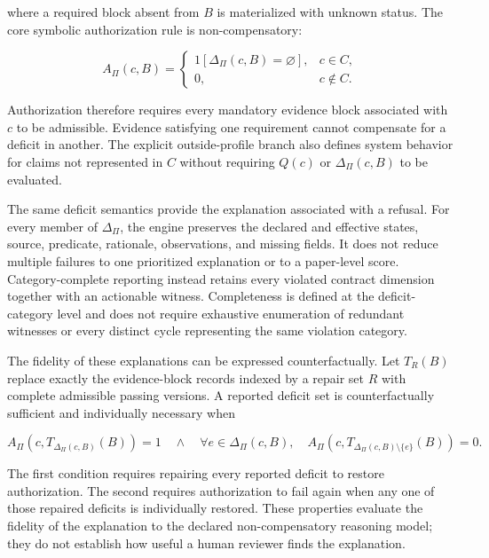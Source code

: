 \documentclass[11pt,a4paper]{article}
\begin{document}
where a required block absent from $B$ is materialized with unknown status.
The core symbolic authorization rule is non-compensatory:

\begin{equation}
A_{\Pi}(c,B)=
\begin{cases}
\mathrm{1}[\Delta_{\Pi}(c,B)=\varnothing], & c\in C,\\
0, & c\notin C.
\end{cases}
\label{eq:core-authorization}
\end{equation}

Authorization therefore requires every mandatory evidence block associated
with $c$ to be admissible. Evidence satisfying one requirement cannot
compensate for a deficit in another. The explicit outside-profile branch also
defines system behavior for claims not represented in $C$ without requiring
$Q(c)$ or $\Delta_{\Pi}(c,B)$ to be evaluated.

The same deficit semantics provide the explanation associated with a refusal.
For every member of $\Delta_{\Pi}$, the engine preserves the declared and
effective states, source, predicate, rationale, observations, and missing
fields. It does not reduce multiple failures to one prioritized explanation or
to a paper-level score. Category-complete reporting instead retains every
violated contract dimension together with an actionable witness. Completeness
is defined at the deficit-category level and does not require exhaustive
enumeration of redundant witnesses or every distinct cycle representing the
same violation category.

The fidelity of these explanations can be expressed counterfactually. Let
$T_R(B)$ replace exactly the evidence-block records indexed by a repair set
$R$ with complete admissible passing versions. A reported deficit set is
counterfactually sufficient and individually necessary when

\begin{equation}
A_{\Pi}(c,T_{\Delta_{\Pi}(c,B)}(B))=1
\quad\land\quad
\forall e\in\Delta_{\Pi}(c,B),\quad
A_{\Pi}(c,T_{\Delta_{\Pi}(c,B)\setminus\{e\}}(B))=0.
\label{eq:counterfactual-explanation}
\end{equation}

The first condition requires repairing every reported deficit to restore
authorization. The second requires authorization to fail again when any one
of those repaired deficits is individually restored. These properties evaluate
the fidelity of the explanation to the declared non-compensatory reasoning
model; they do not establish how useful a human reviewer finds the
explanation.
\end{document}

